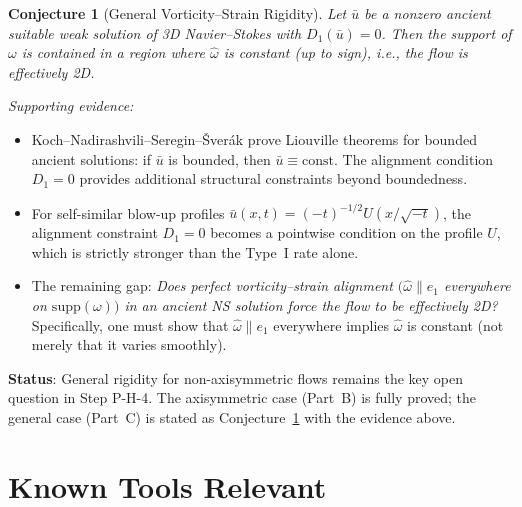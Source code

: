 \documentclass[11pt]{article}
\newtheorem{conjecture}[lemma]{Conjecture}
\theoremstyle{definition}
\begin{document}
\begin{conjecture}[General Vorticity--Strain Rigidity]
\label{conj:rigidity}
Let $\bar{u}$ be a nonzero ancient suitable weak solution of 3D Navier--Stokes
with $D_1(\bar{u}) = 0$.  Then the support of $\omega$ is contained in a region
where $\hat{\omega}$ is constant (up to sign), i.e., the flow is effectively 2D.
\end{conjecture}

\noindent\textit{Supporting evidence:}
\begin{itemize}
  \item Koch--Nadirashvili--Seregin--\v{S}ver\'ak \cite{KNSS} prove Liouville theorems
    for bounded ancient solutions: if $\bar{u}$ is bounded, then $\bar{u} \equiv \mathrm{const}$.
    The alignment condition $D_1 = 0$ provides additional structural constraints
    beyond boundedness.
  \item For self-similar blow-up profiles $\bar{u}(x,t) = (-t)^{-1/2} U(x/\sqrt{-t})$,
    the alignment constraint $D_1 = 0$ becomes a pointwise condition on the
    profile $U$, which is strictly stronger than the Type~I rate alone.
  \item The remaining gap: \textit{Does perfect vorticity--strain alignment
    $(\hat{\omega} \| e_1$ everywhere on $\mathrm{supp}(\omega))$ in an ancient
    NS solution force the flow to be effectively 2D?}
    Specifically, one must show that $\hat{\omega} \| e_1$ everywhere implies
    $\hat{\omega}$ is constant (not merely that it varies smoothly).
\end{itemize}

\noindent\textbf{Status}: General rigidity for non-axisymmetric flows remains the key open question in Step P-H-4.
The axisymmetric case (Part~B) is fully proved; the general case (Part~C) is stated as
Conjecture~\ref{conj:rigidity} with the evidence above.

\section{Known Tools Relevant}
\end{document}
